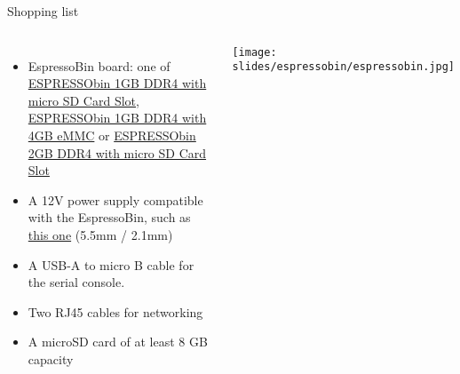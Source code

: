 \begin{frame}[fragile]{Shopping list}
  \begin{columns}
    \begin{itemize}
    \item EspressoBin board: one of
      \href{https://globalscaletechnologies.com/product/espressobin/}{ESPRESSObin
        1GB DDR4 with micro SD Card Slot},
      \href{https://globalscaletechnologies.com/product/espressobin-1gb-ddr4-with-4gb-emmc/}{ESPRESSObin
        1GB DDR4 with 4GB eMMC} or
      \href{https://globalscaletechnologies.com/product/espressobin-2gb-msd-card-slot/}{ESPRESSObin
        2GB DDR4 with micro SD Card Slot}
      \item A 12V power supply compatible with the EspressoBin, such as \href{https://www.amazon.fr/dp/B015MGWBYE}{this one} (5.5mm / 2.1mm)
      \item A USB-A to micro B cable for the serial console.
      \item Two RJ45 cables for networking
      \item A microSD card of at least 8 GB capacity
    \end{itemize}
    \begin{center}
      \texttt{[image: slides/espressobin/espressobin.jpg]}
    \end{center}
  \end{columns}
\end{frame}

